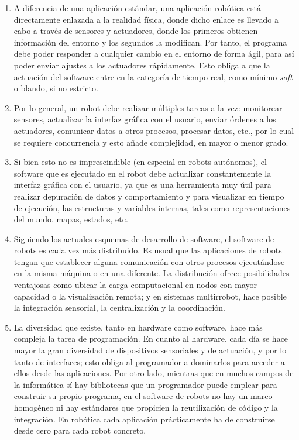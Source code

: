 \begin{enumerate}
	\itemsep1pt \parskip1pt 
	\item A diferencia de una aplicación estándar, una aplicación robótica está directamente enlazada a la realidad física, donde dicho enlace es llevado a cabo a través de sensores y actuadores, donde los primeros obtienen información del entorno y los segundos la modifican. Por tanto, el programa debe poder responder a cualquier cambio en el entorno de forma ágil, para así poder enviar ajustes a los actuadores rápidamente. Esto obliga a que la actuación del software entre en la categoría de tiempo real, como mínimo \textit{soft} o blando, si no estricto.

	\item Por lo general, un robot debe realizar múltiples tareas a la vez: monitorear sensores, actualizar la interfaz gráfica con el usuario, enviar órdenes a los actuadores, comunicar datos a otros procesos, procesar datos, etc., por lo cual se requiere concurrencia y esto añade complejidad, en mayor o menor grado.

	\item Si bien esto no es imprescindible (en especial en robots autónomos), el software que es ejecutado en el robot debe actualizar constantemente la interfaz gráfica con el usuario, ya que es una herramienta muy útil para realizar depuración de datos y comportamiento y para visualizar en tiempo de ejecución, las estructuras y variables internas, tales como representaciones del mundo, mapas, estados, etc.

	\item Siguiendo los actuales esquemas de desarrollo de software, el software de robots es cada vez más distribuido. Es usual que las aplicaciones de robots tengan que establecer alguna comunicación con otros procesos ejecutándose en la misma máquina o en una diferente. La distribución ofrece posibilidades ventajosas como ubicar la carga computacional en nodos con mayor capacidad o la visualización remota; y en sistemas multirrobot, hace posible la integración sensorial, la centralización y la coordinación.

	\item La diversidad que existe, tanto en hardware como software, hace más compleja la tarea de programación. En cuanto al hardware, cada día se hace mayor la gran diversidad de dispositivos sensoriales y de actuación, y por lo tanto de interfaces; esto obliga al programador a dominarlos para acceder a ellos desde las aplicaciones. Por otro lado, mientras que en muchos campos de la informática sí hay bibliotecas que un programador puede emplear para construir su propio programa, en el software de robots no hay un marco homogéneo ni hay estándares que propicien la reutilización de código y la integración. En robótica cada aplicación prácticamente ha de construirse desde cero para cada robot concreto.


\end{enumerate}
